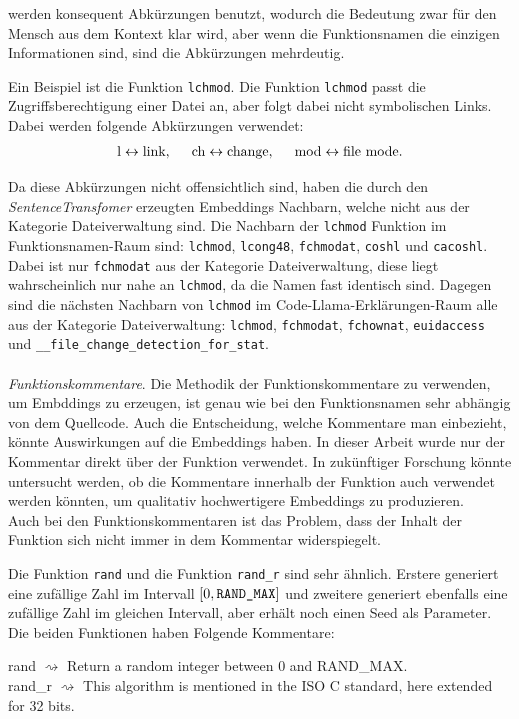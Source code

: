 \documentclass[12pt,letterpaper,ngerman]{article}
\begin{document}
werden konsequent 
Abkürzungen benutzt, wodurch die Bedeutung zwar für den Mensch 
aus dem Kontext klar wird, aber wenn die Funktionsnamen 
die einzigen Informationen sind, sind die Abkürzungen mehrdeutig.
\begin{example}
  Ein Beispiel ist die Funktion
  \verb|lchmod|. Die Funktion \verb|lchmod| passt die
  Zugriffsberechtigung einer Datei an, aber folgt dabei nicht
  symbolischen Links. Dabei werden folgende Abkürzungen verwendet:
  \begin{align*}
    \text{l} \leftrightarrow \text{link}, \hspace{0.5cm}
    \text{ch} \leftrightarrow \text{change},\hspace{0.5cm}
    \text{mod} \leftrightarrow \text{file mode}.
  \end{align*}
\end{example}
Da diese Abkürzungen nicht offensichtlich sind,
haben die durch den \textit{SentenceTransfomer} 
erzeugten Embeddings Nachbarn, welche nicht aus 
der Kategorie Dateiverwaltung sind. Die Nachbarn 
der \texttt{lchmod} Funktion im Funktionsnamen-Raum
sind: \texttt{lchmod}, \texttt{lcong48}, 
\texttt{fchmodat}, \texttt{coshl} und \texttt{cacoshl}. 
Dabei ist nur \texttt{fchmodat} aus der Kategorie 
Dateiverwaltung, diese liegt wahrscheinlich nur 
nahe an \texttt{lchmod},
da die Namen fast identisch sind. Dagegen sind die 
nächsten Nachbarn von \texttt{lchmod} im 
Code-Llama-Erklärungen-Raum alle aus der 
Kategorie Dateiverwaltung: 
\texttt{lchmod}, \texttt{fchmodat}, \texttt{fchownat},
\texttt{euidaccess} und
\texttt{\_\_file\_change\_detection\_for\_stat}.\\\\
\textit{Funktionskommentare}. 
Die Methodik der 
Funktionskommentare zu verwenden, um Embddings zu erzeugen,
ist genau wie bei den Funktionsnamen sehr abhängig von dem
Quellcode. Auch die Entscheidung, welche Kommentare man 
einbezieht, könnte Auswirkungen auf die Embeddings haben.
In dieser Arbeit wurde nur der Kommentar direkt über der 
Funktion verwendet. In zukünftiger Forschung könnte untersucht 
werden, ob die Kommentare innerhalb der Funktion auch verwendet 
werden könnten, um qualitativ hochwertigere Embeddings zu 
produzieren.\\
Auch bei den Funktionskommentaren ist das Problem, dass der 
Inhalt der Funktion sich nicht immer in dem Kommentar
widerspiegelt.
\begin{example}
  Die Funktion \verb|rand| und die Funktion \verb|rand_r| sind 
  sehr ähnlich. Erstere generiert eine zufällige Zahl im 
  Intervall $[0, \verb|RAND_MAX|]$ und zweitere generiert 
  ebenfalls eine zufällige Zahl im gleichen Intervall, aber
  erhält noch einen Seed als Parameter. Die beiden Funktionen
  haben Folgende Kommentare:
  \begin{center}
    rand $\rightsquigarrow$ Return a random integer between 0
      and RAND\_MAX.\\
    rand\_r  $\rightsquigarrow$   This algorithm is mentioned in 
    the ISO C standard, here extended for 32 bits.
  \end{center}
\end{example}
\end{document}
